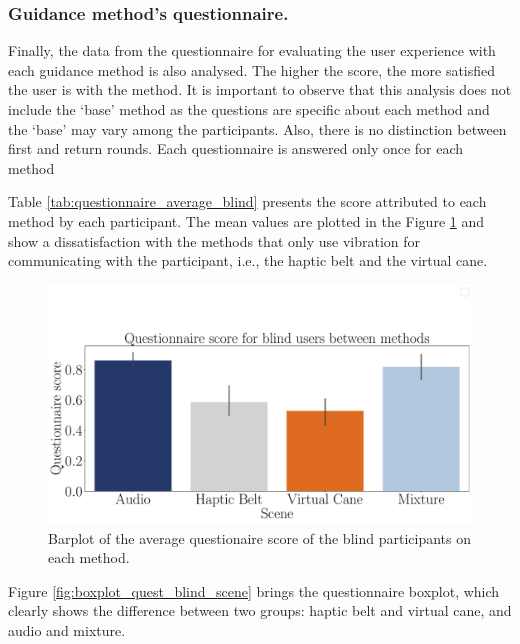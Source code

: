\subsubsection{Guidance method's questionnaire.}
\label{subsubsec:results_questionnaires}

Finally, the data from the questionnaire for evaluating the user experience with each guidance method is also analysed. The higher the score, the more satisfied the user is with the method. It is important to observe that this analysis does not include the ‘base’ method as the questions are specific about each method and the ‘base’ may vary among the participants. Also, there is no distinction between first and return rounds. Each questionnaire is answered only once for each method

Table \ref{tab:questionnaire_average_blind} presents the score attributed to each method by each participant. The mean values are plotted in the Figure \ref{fig:barplot_questionnaire_scene_blind} and show a dissatisfaction with the methods that only use vibration for communicating with the participant, i.e., the haptic belt and the virtual cane. 



\begin{figure}[!htb]
    \centering
    \includegraphics[width = 0.8\linewidth]{Resultados/Questionario/Figuras/pdf/barplot_questionnaire_scene_blind.pdf}
    \caption{Barplot of the average questionaire score of the blind participants on each method.}
    \label{fig:barplot_questionnaire_scene_blind}
\end{figure}

Figure \ref{fig:boxplot_quest_blind_scene} brings the questionnaire boxplot, which clearly shows the difference between two groups: haptic belt and virtual cane, and audio and mixture. 

